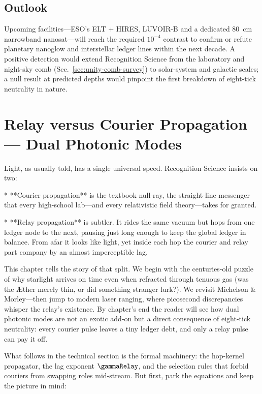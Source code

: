 \documentclass[11pt,oneside]{book}
\begin{document}
{\section*{Outlook}

Upcoming facilities—ESO’s ELT + HIRES, LUVOIR-B and a dedicated
\SI{80}{\centi\meter} narrowband nanosat—will reach the required
\(10^{-4}\) contrast to confirm or refute planetary nanoglow and
interstellar ledger lines within the next decade.  
A positive detection would extend Recognition Science from the
laboratory and night-sky comb (Sec.~\ref{sec:unity-comb-survey}) to
solar-system and galactic scales; a null result at predicted depths
would pinpoint the first breakdown of eight-tick neutrality in
nature.

\chapter{Relay versus Courier Propagation — Dual Photonic Modes}
\label{sec:relay-vs-courier-intro}

Light, as usually told, has a single universal speed.  
Recognition Science insists on two:  

* **Courier propagation** is the textbook null-ray, the straight-line
  messenger that every high-school lab—and every relativistic field
  theory—takes for granted.

* **Relay propagation** is subtler. It rides the same vacuum but hops
  from one ledger node to the next, pausing just long enough to keep
  the global ledger in balance. From afar it looks like light, yet
  inside each hop the courier and relay part company by an almost
  imperceptible lag.

This chapter tells the story of that split.  
We begin with the centuries-old puzzle of why starlight arrives on
time even when refracted through tenuous gas (was the Æther merely
thin, or did something stranger lurk?).  
We revisit Michelson & Morley—then jump to modern laser ranging,
where picosecond discrepancies whisper the relay’s existence.  
By chapter’s end the reader will see how dual photonic modes are not
an exotic add-on but a direct consequence of eight-tick neutrality:
every courier pulse leaves a tiny ledger debt, and only a relay pulse
can pay it off.

What follows in the technical section is the formal machinery: the
hop-kernel propagator, the lag exponent $\gammaRelay$, and the
selection rules that forbid couriers from swapping roles mid-stream.  
But first, park the equations and keep the picture in mind:

}
\end{document}
